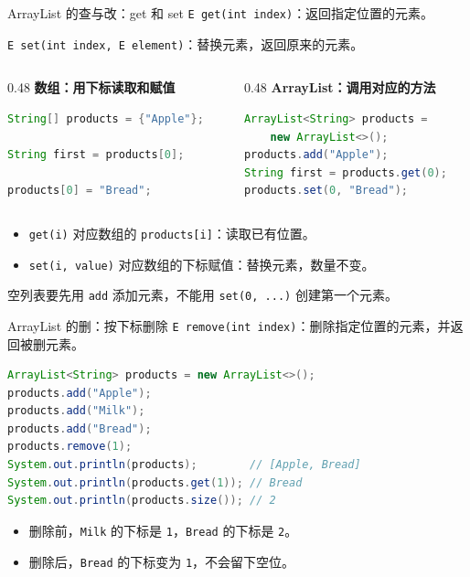 \documentclass[aspectratio=169]{beamer}
\begin{document}
\begin{frame}[fragile]{ArrayList 的查与改：get 和 set}
  \texttt{E get(int index)}：返回指定位置的元素。
  \par
  \texttt{E set(int index, E element)}：替换元素，返回原来的元素。
  \par\medskip
  \begin{columns}[T,onlytextwidth]
    \begin{column}{0.48\textwidth}
      \textbf{数组：用下标读取和赋值}
      \begin{lstlisting}[language=Java]
String[] products = {"Apple"};

String first = products[0];

products[0] = "Bread";
      \end{lstlisting}
    \end{column}
    \begin{column}{0.48\textwidth}
      \textbf{ArrayList：调用对应的方法}
      \begin{lstlisting}[language=Java]
ArrayList<String> products =
    new ArrayList<>();
products.add("Apple");
String first = products.get(0);
products.set(0, "Bread");
      \end{lstlisting}
    \end{column}
  \end{columns}
  \medskip
  \begin{itemize}
    \item \texttt{get(i)} 对应数组的 \texttt{products[i]}：读取已有位置。
    \item \texttt{set(i, value)} 对应数组的下标赋值：替换元素，数量不变。
  \end{itemize}
  空列表要先用 \texttt{add} 添加元素，不能用 \texttt{set(0, ...)} 创建第一个元素。
\end{frame}
\begin{frame}[fragile]{ArrayList 的删：按下标删除}
  \texttt{E remove(int index)}：删除指定位置的元素，并返回被删元素。
  \begin{lstlisting}[language=Java]
ArrayList<String> products = new ArrayList<>();
products.add("Apple");
products.add("Milk");
products.add("Bread");
products.remove(1);
System.out.println(products);        // [Apple, Bread]
System.out.println(products.get(1)); // Bread
System.out.println(products.size()); // 2
  \end{lstlisting}
  \begin{itemize}
    \item 删除前，\texttt{Milk} 的下标是 \texttt{1}，\texttt{Bread} 的下标是 \texttt{2}。
    \item 删除后，\texttt{Bread} 的下标变为 \texttt{1}，不会留下空位。
  \end{itemize}
\end{frame}
\end{document}
